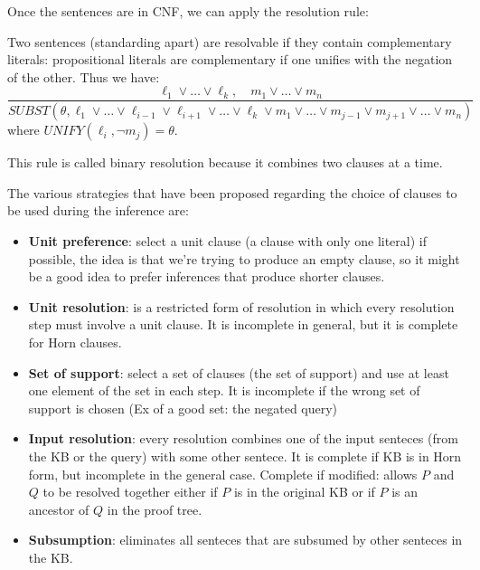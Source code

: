 \documentclass[12pt]{article}
\begin{document}
\begin{enumerate}[label=\textbf{FOL.\arabic*}]
    Once the sentences are in CNF, we can apply the resolution rule:

    Two sentences (standarding apart) are resolvable if they contain complementary literals: propositional literals are complementary if one unifies with the negation of the other.
    Thus we have:
    \begin{equation}
        \frac{\ell_1\lor\ldots\lor \ell_k,\quad m_1\lor\ldots\lor m_n}
        {SUBST(\theta,\ell_1\lor\ldots\lor\ell_{i-1}\lor\ell_{i+1}\lor\ldots\lor\ell_k\lor m_1\lor\ldots\lor m_{j-1}\lor m_{j+1}\lor\ldots\lor m_n)}
    \end{equation}
    where $UNIFY(\ell_i,\lnot m_j) = \theta$.

    This rule is called binary resolution because it combines two clauses at a time.

    The various strategies that have been proposed regarding the choice of clauses to be used during the inference are:
    \begin{itemize}
        \item \textbf{Unit preference}: select a unit clause (a clause with only one literal) if possible, the idea is that we're trying to produce an empty clause, so it might be a good idea to prefer inferences that produce shorter clauses.
        \item \textbf{Unit resolution}: is a restricted form of resolution in which every resolution step must involve a unit clause.
        It is incomplete in general, but it is complete for Horn clauses.
        \item \textbf{Set of support}: select a set of clauses (the set of support) and use at least one element of the set in each step.
        It is incomplete if the wrong set of support is chosen (Ex of a good set: the negated query)
        \item \textbf{Input resolution}: every resolution combines one of the input senteces (from the KB or the query) with some other sentece.
        It is complete if KB is in Horn form, but incomplete in the general case. 
        Complete if modified: allows $P$ and $Q$ to be resolved together either if $P$ is in the original KB or if $P$ is an ancestor of $Q$ in the proof tree.
        \item \textbf{Subsumption}: eliminates all senteces that are subsumed by other senteces in the KB\@.
    \end{itemize}

\end{enumerate}
\end{document}
